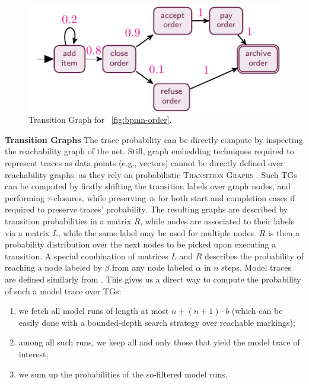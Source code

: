 \begin{figure}[!t]
	\centering
	\includegraphics[width=.4\textwidth]{images/besser_rg}
	\caption{Transition Graph for \figurename~\ref{fig:bpmn-order}.}
\end{figure}
\medskip
\noindent
\textbf{Transition Graphs} The trace probability can be directly compute by inspecting the reachability graph of the net. Still, graph embedding techniques required to represent traces as data points (e.g., vectors) 
cannot be directly defined over reachability graphs. as they %
rely on probabilistic \textsc{Transition Graphs} \cite{GartnerFW03}.  Such TGs can be computed by firstly shifting the transition labels over graph nodes, and performing $\tau$-closures, while preserving $\tau$s for both start and completion cases if required to preserve traces' probability. The resulting  graphs are described by transition probabilities in a matrix $R$, while nodes are associated to their labels via a matrix $L$, while the same label may be used for multiple nodes. $R$ is then a probability distribution over the next nodes to be picked upon executing a transition.
A special combination of matrices $L$ and $R$ \cite{GartnerFW03} describes the probability of reaching a node labeled by $\beta$ from any node labeled $\alpha$ in $n$ steps. Model traces  are defined similarly from . This gives us a direct way to compute the probability of such a model trace over TGs:
\begin{enumerate}
	\item  we fetch all model runs of length at most $n+(n+1)\cdot b$ (which can be easily done with a bounded-depth search strategy over reachable markings);
	\item among all such runs, we keep all and only those that yield the model trace of interest;
	\item we sum up the probabilities of the so-filtered model runs.
\end{enumerate}



